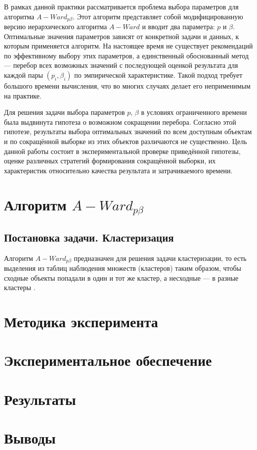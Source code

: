 \documentclass[12pt,twoside,a4paper,tikz,border=5]{refart}
\begin{document}
		В рамках данной практики рассматривается проблема выбора параметров для алгоритма $ A-Ward_{p\beta} $. Этот алгоритм представляет собой модифицированную версию иерархического алгоритма $ A-Ward $ и вводит два параметра: $ p $ и $ \beta $. Оптимальные значения параметров зависят от конкретной задачи и данных, к которым применяется алгоритм. На настоящее время не существует рекомендаций по эффективному выбору этих параметров, а единственный обоснованный метод --- перебор всех возможных значений с последующей оценкой результата для каждой пары $ (p_i,\beta_i) $  по эмпирической характеристике. Такой подход требует большого времени вычисления, что во многих случаях делает его неприменимым на практике.
		
		Для решения задачи выбора параметров $ p$, $\beta $ в условиях ограниченного времени была выдвинута гипотеза о возможном сокращении перебора. Согласно этой гипотезе, результаты выбора оптимальных значений по всем доступным объектам и по сокращённой выборке из этих объектов различаются не существенно. Цель данной работы состоит в экспериментальной проверке приведённой гипотезы, оценке различных стратегий формирования сокращённой выборки, их характеристик относительно качества результата и затрачиваемого времени.
	
	\section{Алгоритм $ A-Ward_{p\beta} $}
		\subsection{Постановка задачи. Кластеризация}
			Алгоритм $ A-Ward_{p\beta} $ предназначен для решения задачи кластеризации, то есть выделения из таблиц наблюдения множеств (кластеров) таким образом, чтобы сходные объекты попадали в один и тот же кластер, а несходные --- в разные кластеры \cite{data-science}. 
	
	
	\section{Методика эксперимента}
	\section{Экспериментальное обеспечение}
	\section{Результаты}
	\section{Выводы}
	
	\newpage
	\nocite{amorim} \nocite{ward} \nocite{boley} \nocite{tasoulis} \nocite{kovaleva} \nocite{mirkin}
	
	
	
\end{document}
